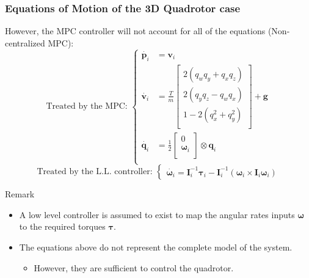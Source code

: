 \documentclass{thesisbeamer}
\newcommand\Fontvi{\fontsize{9}{10}\selectfont}
\begin{document}
\begin{frame}
	\frametitle{Equations of Motion of the 3D Quadrotor case}
	\Fontvi
	
	However, the MPC controller will not account for all of the equations (Non-centralized MPC):
	$$
		\text{Treated by the MPC: }\left\{
		\begin{array}{lll}				
			\dot{\bm{p}_i} &= \bm{v}_i \\
			\dot{\bm{v}_i} &= 
			\frac{T}{m} 
			\begin{bmatrix}
				2 (q_w q_y + q_x q_z) \\
				2 (q_y q_z - q_w q_x) \\
				1 - 2(q_x^2 + q_y^2 ) \\
			\end{bmatrix} + \bm{g} \\			
			\dot{\bm{q}_i} & = \frac{1}{2}
			\begin{bmatrix}
				0 \\
				\bm{\omega}_i \\
			\end{bmatrix} \otimes \bm{q}_i \\
		\end{array}
		\right.
	$$
	$$
			\text{Treated by the L.L. controller: }\left\{
			\begin{array}{l}	
				\dot{\bm{\omega}_i} = \bm{I}_i^{-1} \bm{\tau}_i - \bm{I}_i^{-1} (\bm{\omega}_i \times \bm{I}_i \bm{\omega}_i)
			\end{array}
			\right.
	$$

	\begin{alertblock}{Remark}
		\begin{itemize} %
			\item A low level controller is assumed to exist to map the angular rates inputs $\bm{\omega}$ to the required torques $\bm{\tau}$. 
			\item The equations above do not represent the complete model of the system.
			\begin{itemize}
				\item \fontsize{9pt}{10pt}\selectfont However, they are sufficient to control the quadrotor.
			\end{itemize}
		\end{itemize}
	\end{alertblock}						
				
\end{frame}
\end{document}
